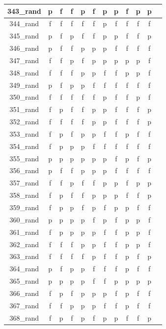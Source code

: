 \documentclass[
fancyheadings, %
%
%
]{stsreprt}
\begin{document}
\begin{longtable}{|c|c|c|c|c|c|c|c|c|c|c|c|}
\hline
343\_rand & p & f & f & p & f & p & p & f & p & p \\
\hline
344\_rand & f & f & f & f & f & p & f & f & f & f \\
\hline
345\_rand & p & f & p & f & f & p & p & f & f & p \\
\hline
346\_rand & p & f & f & p & p & p & f & f & f & f \\
\hline
347\_rand & f & f & p & f & p & p & p & p & p & f \\
\hline
348\_rand & f & f & f & p & p & f & f & p & p & f \\
\hline
349\_rand & p & f & p & p & f & f & f & f & f & f \\
\hline
350\_rand & f & f & f & f & f & p & f & f & p & f \\
\hline
351\_rand & f & p & f & f & p & p & f & f & f & p \\
\hline
352\_rand & f & f & f & f & p & p & f & f & f & p \\
\hline
353\_rand & f & p & f & p & p & f & f & p & f & f \\
\hline
354\_rand & f & p & p & p & f & f & f & f & f & f \\
\hline
355\_rand & p & p & p & p & p & p & f & p & f & p \\
\hline
356\_rand & p & f & f & p & p & p & f & f & f & f \\
\hline
357\_rand & f & f & p & f & f & p & p & f & p & p \\
\hline
358\_rand & f & p & f & f & p & p & p & f & f & p \\
\hline
359\_rand & f & p & p & f & p & f & p & p & f & f \\
\hline
360\_rand & p & p & p & p & f & p & f & p & p & f \\
\hline
361\_rand & f & p & p & p & p & f & f & p & p & f \\
\hline
362\_rand & f & f & f & p & p & f & f & p & p & f \\
\hline
363\_rand & f & f & f & f & p & f & f & p & f & p \\
\hline
364\_rand & p & f & p & p & f & f & f & p & f & f \\
\hline
365\_rand & p & p & p & p & f & f & p & p & p & p \\
\hline
366\_rand & f & p & f & p & p & p & f & p & f & f \\
\hline
367\_rand & f & f & p & p & p & f & f & p & f & f \\
\hline
368\_rand & f & p & f & p & f & p & p & f & f & p \\

\end{longtable}
\end{document}
